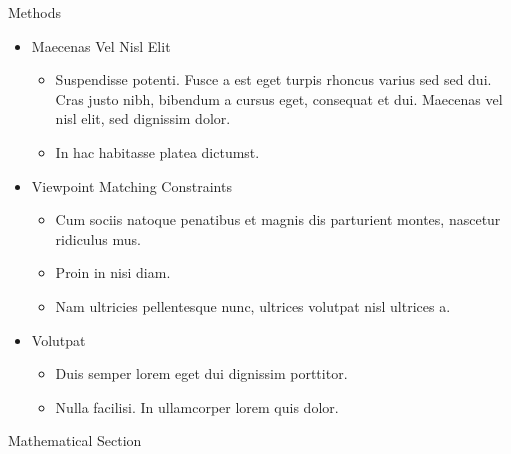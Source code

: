 \documentclass[final,hyperref={pdfpagelabels=false}]{beamer}
\begin{document}
\begin{frame}[t]
\begin{columns}[t]
\begin{column}{.465\textwidth}
\begin{block}{Methods}

\begin{itemize}
\item Maecenas Vel Nisl Elit
\begin{itemize}
\item Suspendisse potenti. Fusce a est eget turpis rhoncus varius sed sed dui. Cras justo nibh, bibendum a cursus eget, consequat et dui. Maecenas vel nisl elit, sed dignissim dolor. 
\item In hac habitasse platea dictumst.
\end{itemize}

\item Viewpoint Matching Constraints
\begin{itemize}
\item Cum sociis natoque penatibus et magnis dis parturient montes, nascetur ridiculus mus. 
\item Proin in nisi diam.
\item Nam ultricies pellentesque nunc, ultrices volutpat nisl ultrices a.
\end{itemize}

\item Volutpat 
\begin{itemize}
\item Duis semper lorem eget dui dignissim porttitor.
\item Nulla facilisi. In ullamcorper lorem quis dolor.
\end{itemize}
\end{itemize}

\end{block}


\begin{block}{Mathematical Section}


\end{block}
\end{column}
\end{columns}
\end{frame}
\end{document}
